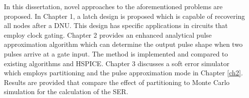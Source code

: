 In this dissertation, novel approaches to the aforementioned problems are proposed. In Chapter 1, a latch design is proposed which is capable of recovering all nodes after a DNU. This design has specific applications in circuits that employ clock gating. Chapter 2 provides an enhanced analytical pulse approximation algorithm which can determine the output pulse shape when two pulses arrive at a gate input. The method is implemented and compared to existing algorithms and HSPICE. Chapter 3 discusses a soft error simulator which employs partitioning and the pulse approximation mode in Chapter \ref{ch2}. Results are provided that compare the effect of partitioning to Monte Carlo simulation for the calculation of the SER.